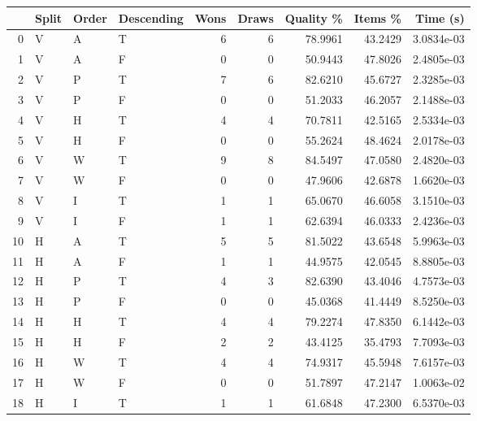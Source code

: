 \begin{tabular}{rlllrrrrr}
    \hline
    & Split & Order & Descending & Wons & Draws & Quality \% & Items \% & Time (s)   \\
    \hline
    0  & V     & A     & T          & 6    & 6     & 78.9961    & 43.2429  & 3.0834e-03 \\
    1  & V     & A     & F          & 0    & 0     & 50.9443    & 47.8026  & 2.4805e-03 \\
    2  & V     & P     & T          & 7    & 6     & 82.6210    & 45.6727  & 2.3285e-03 \\
    3  & V     & P     & F          & 0    & 0     & 51.2033    & 46.2057  & 2.1488e-03 \\
    4  & V     & H     & T          & 4    & 4     & 70.7811    & 42.5165  & 2.5334e-03 \\
    5  & V     & H     & F          & 0    & 0     & 55.2624    & 48.4624  & 2.0178e-03 \\
    6  & V     & W     & T          & 9    & 8     & 84.5497    & 47.0580  & 2.4820e-03 \\
    7  & V     & W     & F          & 0    & 0     & 47.9606    & 42.6878  & 1.6620e-03 \\
    8  & V     & I     & T          & 1    & 1     & 65.0670    & 46.6058  & 3.1510e-03 \\
    9  & V     & I     & F          & 1    & 1     & 62.6394    & 46.0333  & 2.4236e-03 \\
    10 & H     & A     & T          & 5    & 5     & 81.5022    & 43.6548  & 5.9963e-03 \\
    11 & H     & A     & F          & 1    & 1     & 44.9575    & 42.0545  & 8.8805e-03 \\
    12 & H     & P     & T          & 4    & 3     & 82.6390    & 43.4046  & 4.7573e-03 \\
    13 & H     & P     & F          & 0    & 0     & 45.0368    & 41.4449  & 8.5250e-03 \\
    14 & H     & H     & T          & 4    & 4     & 79.2274    & 47.8350  & 6.1442e-03 \\
    15 & H     & H     & F          & 2    & 2     & 43.4125    & 35.4793  & 7.7093e-03 \\
    16 & H     & W     & T          & 4    & 4     & 74.9317    & 45.5948  & 7.6157e-03 \\
    17 & H     & W     & F          & 0    & 0     & 51.7897    & 47.2147  & 1.0063e-02 \\
    18 & H     & I     & T          & 1    & 1     & 61.6848    & 47.2300  & 6.5370e-03 \\

\end{tabular}
